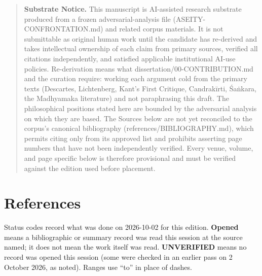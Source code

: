 \documentclass[11pt]{article}
\begin{document}
\begin{quote}
\textbf{Substrate Notice.} This manuscript is AI-assisted research substrate produced from a frozen adversarial-analysis file (ASEITY-CONFRONTATION.md) and related corpus materials. It is not submittable as original human work until the candidate has re-derived and takes intellectual ownership of each claim from primary sources, verified all citations independently, and satisfied applicable institutional AI-use policies. Re-derivation means what dissertation/\allowbreak{}00-CONTRIBUTION.md and the curation require: working each argument cold from the primary texts (Descartes, Lichtenberg, Kant’s First Critique, Candrakīrti, Śaṅkara, the Madhyamaka literature) and not paraphrasing this draft. The philosophical positions stated here are bounded by the adversarial analysis on which they are based. The Sources below are not yet reconciled to the corpus’s canonical bibliography (references/\allowbreak{}BIBLIOGRAPHY.md), which permits citing only from its approved list and prohibits asserting page numbers that have not been independently verified. Every venue, volume, and page specific below is therefore provisional and must be verified against the edition used before placement.
\end{quote}

\section*{References}

Status codes record what was done on 2026-10-02 for this edition. \textbf{Opened} means a bibliographic or summary record was read this session at the source named; it does not mean the work itself was read. \textbf{UNVERIFIED} means no record was opened this session (some were checked in an earlier pass on 2 October 2026, as noted). Ranges use ``to'' in place of dashes.
\end{document}
